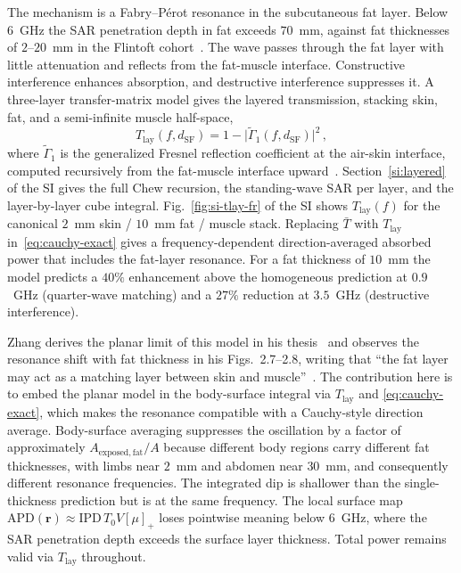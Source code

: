\documentclass[journal,twocolumn,10pt]{IEEEtran}
\newcommand{\rr}{\mathbf{r}}
\newcommand{\IPD}{\mathrm{IPD}}
\newcommand{\APD}{\mathrm{APD}}
\newcommand{\Tbar}{\bar{T}}
\newcommand{\Tlay}{T_{\mathrm{lay}}}
\newcommand{\pospart}[1]{\left[#1\right]_{+}}
\newcommand{\Vis}{V}
\begin{document}
The mechanism is a Fabry--P\'erot resonance in the subcutaneous fat
layer. Below $6$~GHz the SAR penetration depth in fat exceeds
$70$~mm, against fat thicknesses of $2$--$20$~mm in the Flintoft
cohort~\cite[Table~1]{Flintoft2014}. The wave passes through the fat
layer with little attenuation and reflects from the fat-muscle
interface. Constructive interference enhances absorption, and destructive
interference suppresses it. A three-layer transfer-matrix model gives the layered transmission,
stacking skin, fat, and a semi-infinite muscle half-space,
\begin{equation}\label{eq:T-lay}
  \Tlay(f, d_{\mathrm{SF}})
  = 1 - \bigl|\widetilde{\Gamma}_1(f, d_{\mathrm{SF}})\bigr|^2\, ,
\end{equation}
where $\widetilde{\Gamma}_1$ is the generalized Fresnel reflection
coefficient at the air-skin interface, computed recursively from the
fat-muscle interface upward~\cite{Chew1995,BornWolf1999}.
Section~\ref{si:layered} of the SI gives the full Chew recursion,
the standing-wave SAR per layer, and the layer-by-layer cube
integral. Fig.~\ref{fig:si-tlay-fr} of the SI shows $\Tlay(f)$ for
the canonical $2$~mm skin / $10$~mm fat / muscle stack. Replacing
$\Tbar$ with $\Tlay$ in~\eqref{eq:cauchy-exact} gives a
frequency-dependent direction-averaged absorbed power that includes
the fat-layer resonance. For a fat thickness of $10$~mm the model
predicts a $40\%$ enhancement above the homogeneous prediction at
$0.9$~GHz (quarter-wave matching) and a $27\%$ reduction at
$3.5$~GHz (destructive interference).

Zhang derives the planar limit of this model in his
thesis~\cite[Sec.~2.2]{Zhang2017thesis} and observes the resonance
shift with fat thickness in his Figs.~2.7--2.8, writing that ``the
fat layer may act as a matching layer between skin and
muscle''~\cite[p.~21]{Zhang2017thesis}. The contribution here is to
embed the planar model in the body-surface integral via $\Tlay$ and
\eqref{eq:cauchy-exact}, which makes the resonance compatible with a
Cauchy-style direction average. Body-surface averaging suppresses
the oscillation by a factor of approximately
$A_{\mathrm{exposed,fat}}/A$ because different body regions carry
different fat thicknesses, with limbs near $2$~mm and abdomen near
$30$~mm, and consequently different resonance frequencies. The
integrated dip is shallower than the single-thickness prediction but
is at the same frequency. The local surface map
$\APD(\rr) \approx \IPD\,T_0 \Vis \pospart{\mu}$ loses pointwise
meaning below $6$~GHz, where the SAR penetration depth exceeds the
surface layer thickness. Total power remains valid via $\Tlay$
throughout.
\end{document}
